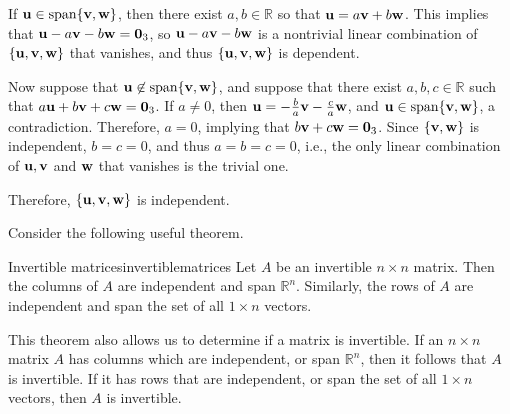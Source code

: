 \begin{solution}
If ${\bf u}\in\mbox{span}\{{\bf v},{\bf w}\}$, then there exist $a,b\in\mathbb{R}$ so
that ${\bf u}=a{\bf v} + b{\bf w}$.
This implies that ${\bf u}-a{\bf v} - b{\bf w}={\bf 0}_3$,
so  ${\bf u}-a{\bf v} - b{\bf w}$
is a nontrivial linear combination of $\{ {\bf u},{\bf v},{\bf w}\}$ that
vanishes, 
and thus $\{ {\bf u},{\bf v},{\bf w}\}$ is dependent.

Now suppose that ${\bf u}\not\in\mbox{span}\{{\bf v},{\bf w}\}$, and suppose
that there exist $a,b,c\in\mathbb{R}$ such that
$a{\bf u}+b{\bf v}+c{\bf w}={\bf 0}_3$.
If $a\neq 0$, then ${\bf u}=-\frac{b}{a}{\bf v}-\frac{c}{a}{\bf w}$,
and ${\bf u}\in\mbox{span}\{{\bf v},{\bf w}\}$, a contradiction.
Therefore, $a=0$, implying that $b{\bf v}+c{\bf w}={\bf 0}_3$.
Since $\{ {\bf v},{\bf w}\}$ is independent, $b=c=0$, and thus
$a=b=c=0$, i.e., the only linear combination of 
${\bf u},{\bf v}$ and ${\bf w}$ that vanishes is the trivial one.

Therefore, $\{ {\bf u},{\bf v},{\bf w}\}$ is independent.
\end{solution}

Consider the following useful theorem.

\begin{theorem}{Invertible matrices}{invertiblematrices}
Let $A$ be an invertible $n \times n$ matrix. Then the columns of $A$ are independent and span $\mathbb{R}^n$. Similarly, the rows of $A$ are independent and span the set of all $1 \times n$ vectors. 
\end{theorem}

This theorem also allows us to determine if a matrix is invertible. If an $n \times n$ matrix $A$ has columns which are independent, or span $\mathbb{R}^n$, then it follows that $A$ is invertible. If it has rows that are independent, or span the set of all $1 \times n$ vectors, then $A$ is invertible.
